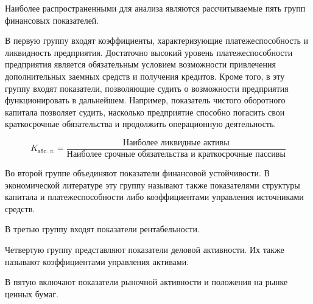 Наиболее распространенными для анализа являются рассчитываемые пять групп финансовых показателей.

В первую группу входят коэффициенты, характеризующие платежеспособность и ликвидность предприятия. Достаточно высокий уровень платежеспособности предприятия является обязательным условием возможности привлечения дополнительных заемных средств и получения кредитов. Кроме того, в эту группу входят показатели, позволяющие судить о возможности предприятия функционировать в дальнейшем. Например, показатель чистого оборотного капитала позволяет судить, насколько предприятие способно погасить свои краткосрочные обязательства и продолжить операционную деятельность.

\[ K_{\text{абс. л.}} = \dfrac{\text{Наиболее ликвидные активы}}{\text{Наиболее срочные обязательства и краткосрочные пассивы}} \]

Во второй группе объединяют показатели финансовой устойчивости. В экономической литературе эту группу называют также показателями структуры капитала и платежеспособности либо коэффициентами управления источниками средств.

В третью группу входят показатели рентабельности.

Четвертую группу представляют показатели деловой активности. Их также называют коэффициентами управления активами.

В пятую включают показатели рыночной активности и положения на рынке ценных бумаг.